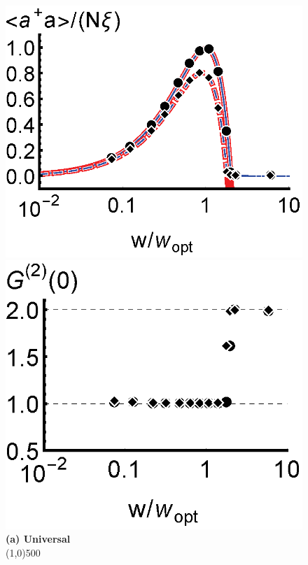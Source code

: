 \documentclass[aps,
twocolumn,
superscriptaddress,groupedaddress]{revtex4}
\begin{document}
\begin{figure}
\begin{center}
	\hspace{-6.5mm} \includegraphics[scale =0.445] {N10000ada.eps}
	\hspace{-5.5mm} \includegraphics[scale =0.445] {N10000G2S.eps}\\
	\textbf{(a) Universal}\\
	\line(1,0){500}\\

\end{center}
\end{figure}
\end{document}
